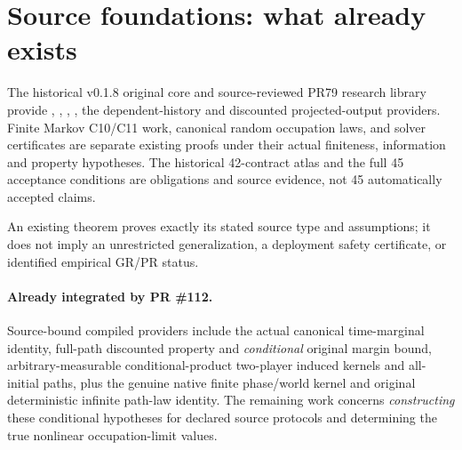 \section{Source foundations: what already exists}
The historical v0.1.8 original core and source-reviewed PR79 research
library provide , ,
, , the
dependent-history  and discounted projected-output
providers. Finite Markov C10/C11 work, canonical random occupation
laws, and solver certificates are separate existing proofs under their
actual finiteness, information and property hypotheses.
The historical 42-contract atlas and the full 45 acceptance conditions
are obligations and source evidence, not 45 automatically accepted claims.
\begin{remark}
An existing theorem proves exactly its stated source type and assumptions;
it does not imply an unrestricted generalization, a deployment safety
certificate, or identified empirical GR/PR status.
\end{remark}


\paragraph{Already integrated by PR \#112.}
Source-bound compiled providers include the actual canonical time-marginal
identity, full-path discounted property and \emph{conditional} original
margin bound, arbitrary-measurable conditional-product two-player induced
kernels and all-initial paths, plus the genuine native finite phase/world
kernel and original deterministic infinite path-law identity. The remaining
work concerns \emph{constructing} these conditional hypotheses for declared
source protocols and determining the true nonlinear occupation-limit values.
